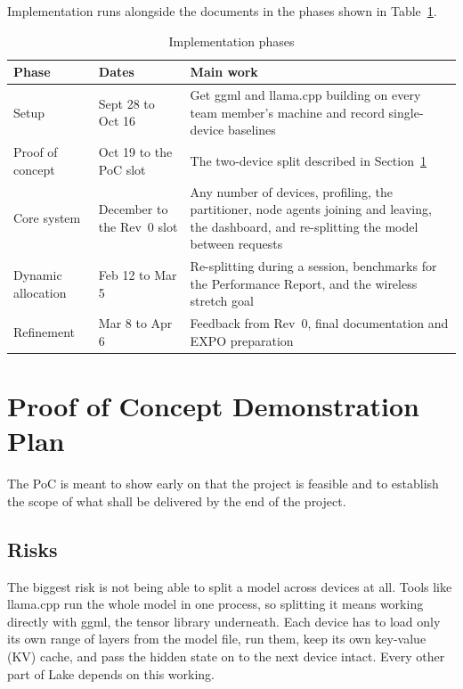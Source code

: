\documentclass{article}
\begin{document}
Implementation runs alongside the documents in the phases shown in
Table~\ref{TblPhases}. 

\begin{table}[!htbp]
\centering
\caption{Implementation phases}
\label{TblPhases}
\small
\renewcommand{\arraystretch}{1.2}
\begin{tabularx}{\textwidth}{>{\raggedright\arraybackslash}p{2.6cm}%
>{\raggedright\arraybackslash}p{3.1cm}>{\raggedright\arraybackslash}X}
\toprule
\textbf{Phase} & \textbf{Dates} & \textbf{Main work}\\
\midrule
Setup & Sept 28 to Oct 16 & Get ggml and llama.cpp building on every team
  member's machine and record single-device baselines\\
Proof of concept & Oct 19 to the PoC slot & The two-device split described in
  Section~\ref{SecPoC}\\
Core system & December to the Rev~0 slot & Any number of devices, profiling,
  the partitioner, node agents joining and leaving, the dashboard, and
  re-splitting the model between requests\\
Dynamic allocation & Feb 12 to Mar 5 & Re-splitting during a session,
  benchmarks for the Performance Report, and the wireless stretch goal\\
Refinement & Mar 8 to Apr 6 & Feedback from Rev~0, final documentation and
  EXPO preparation\\
\bottomrule
\end{tabularx}
\end{table}

\FloatBarrier

\section{Proof of Concept Demonstration Plan}
\label{SecPoC}

The PoC is meant to show early on that the project is feasible and to establish the scope of what shall be delivered by the end of the project.

\subsection{Risks}

The biggest risk is not being able to split a model across devices at all.
Tools like llama.cpp run the whole model in one process, so splitting it means
working directly with ggml, the tensor library underneath. Each device has to
load only its own range of layers from the model file, run them, keep its own
key-value (KV) cache, and pass the hidden state on to the next device intact.
Every other part of Lake depends on this working.
\end{document}
